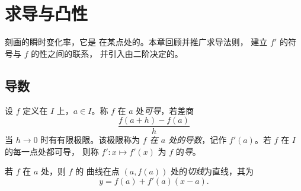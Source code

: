 \chapter{求导与凸性}\label{ch:g12:deriv}

刻画的瞬时变化率，它是
在某点处的。本章回顾并推广求导法则，
建立 $f'$ 的符号与 $f$ 的性之间的联系，
并引入由二阶决定的。

\section{导数}

\begin{definition}[一点处的导数]\label{def:g12:deriv:derivative}
设 $f$ 定义在 $I$ 上，$a \in I$。称 $f$
在 $a$ 处\emph{可导}，若差商
\[
\frac{f(a+h) - f(a)}{h}
\]
当 $h \to 0$ 时有有限极限。该极限称为
\emph{$f$ 在 $a$ 处的导数}，记作 $f'(a)$。若 $f$ 在 $I$ 的每一点处都可导，
则称 $f' \colon x \mapsto f'(x)$ 为
$f$ 的\emph{导}。
\end{definition}

\begin{definition}[切线]\label{def:g12:deriv:tangent}
若 $f$ 在 $a$ 处，则 $f$ 的
曲线在点 $(a, f(a))$ 处的\emph{切线}为直线，其为
\[
y = f(a) + f'(a)(x - a).
\]
\end{definition}

